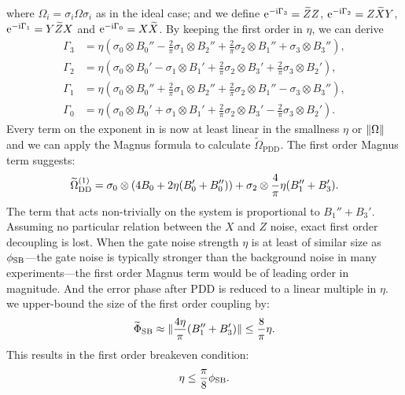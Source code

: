 \documentclass[pra,reprint,superscriptaddress]{revtex4-2}
\newcommand{\wt}[1]{\widetilde{#1}}
\newcommand{\rDD}{\mathrm{DD}}
\begin{document}
where $\Omega_i = \sigma_i \Omega \sigma_i$ as in the ideal case; and we define
$\upe^{-\upi  \Gamma_3}=\wt Z Z$, 
$\upe^{-\upi  \Gamma_2}=Z \wt X Y$,
$\upe^{-\upi  \Gamma_1}=Y \wt Z X$ and 
$\upe^{-\upi  \Gamma_0}=X \wt X$.
By keeping the first order in 
$\eta$, we can derive
\begin{equation}
 \begin{aligned}
  \Gamma_3 &= \eta(\sigma_0 \otimes B_0''- \frac{2}{\pi} \sigma_1 \otimes B_2'' 
  +\frac{2}{\pi}  \sigma_2 \otimes B_1'' + \sigma_3 \otimes B_3''),\\
  \Gamma_2 &= \eta(\sigma_0 \otimes B_0'- \sigma_1 \otimes B_1'
  +\frac{2}{\pi}  \sigma_2 \otimes B_3' + \frac{2}{\pi} \sigma_3 \otimes B_2'),\\
  \Gamma_1 &= \eta(\sigma_0 \otimes B_0''+ \frac{2}{\pi} \sigma_1 \otimes B_2'' 
  +\frac{2}{\pi}  \sigma_2 \otimes B_1'' - \sigma_3 \otimes B_3''),\\
  \Gamma_0 &= \eta(\sigma_0 \otimes B_0'+ \sigma_1 \otimes B_1'
  +\frac{2}{\pi}  \sigma_2 \otimes B_3' - \frac{2}{\pi} \sigma_3 \otimes B_2').
 \end{aligned}
\end{equation}
Every term on the exponent in   is now at least linear in the smallness $\eta$ or $\Vert {\Omega} \Vert$ and we can apply the Magnus formula to calculate $\widetilde\Omega_\mathrm{PDD}$. 
The first order Magnus term suggests:
\begin{equation}
 \wt\Omega_\rDD\up{1}= \sigma_0 \otimes (4B_0 + 2\eta( B'_0 + B''_0)) 
+ \sigma_2 \otimes \frac{4}{\pi}\eta(B_1''+B_3').
\end{equation}
The term that acts non-trivially on the system is proportional to $B_1''+B_3'$. 
Assuming no particular relation between the $X$ and $Z$ noise,  exact first order decoupling is lost. 
When the gate noise strength $\eta$ is at least of similar size as $\phi_{\mathrm{SB}}$---the gate noise is typically stronger than the background noise in many experiments---the first order Magnus term would be of leading order in magnitude. And the error phase after PDD is reduced to a linear multiple in $\eta$. 
 we upper-bound the size of the first order coupling by:
\begin{equation}
 \wt\Phi_\rSB \approx \norm{ \frac{4\eta}{\pi}(B_1''+B_3')} \le \frac{8}{\pi}\eta.
\end{equation}
This results in the first order breakeven condition:
\begin{equation}
 \eta \le \frac{\pi}{8} \phi_{\mathrm{SB}}.
\end{equation}
\end{document}
